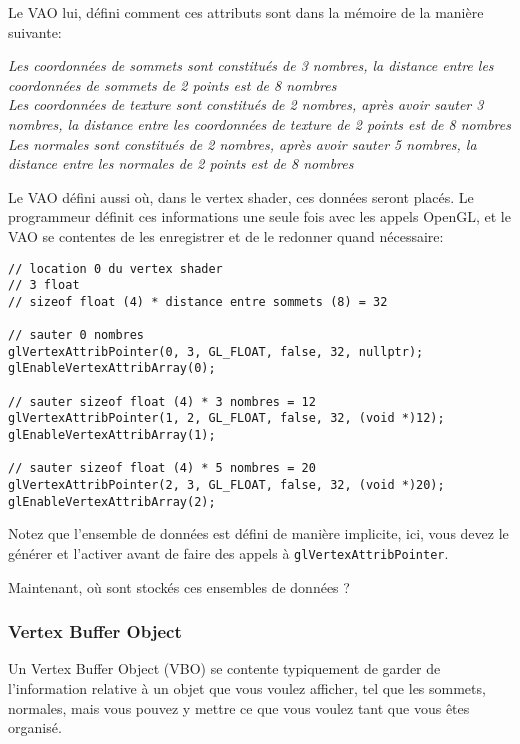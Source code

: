 \documentclass[11pt, a4paper, titlepage]{article}
\begin{document}
Le VAO lui, défini comment ces attributs sont dans la mémoire de la
manière suivante:

\emph{Les coordonnées de sommets sont constitués de 3 nombres, la
  distance entre les coordonnées de sommets de 2 points est de 8
  nombres\\}
\emph{Les coordonnées de texture sont constitués de 2
  nombres, après avoir sauter 3 nombres, la distance entre les
  coordonnées de texture de 2 points est de 8 nombres\\}
\emph{Les normales sont constitués de 2 nombres, après avoir sauter
 5 nombres, la distance entre les normales de 2 points est de 8
 nombres\\}

\pagebreak

Le VAO défini aussi où, dans le vertex shader, ces données seront
placés.  Le programmeur définit ces informations une seule fois avec
les appels OpenGL, et le VAO se contentes de les enregistrer et de le
redonner quand nécessaire:

\begin{lstlisting}
// location 0 du vertex shader
// 3 float
// sizeof float (4) * distance entre sommets (8) = 32

// sauter 0 nombres
glVertexAttribPointer(0, 3, GL_FLOAT, false, 32, nullptr);
glEnableVertexAttribArray(0);

// sauter sizeof float (4) * 3 nombres = 12
glVertexAttribPointer(1, 2, GL_FLOAT, false, 32, (void *)12);
glEnableVertexAttribArray(1);

// sauter sizeof float (4) * 5 nombres = 20 
glVertexAttribPointer(2, 3, GL_FLOAT, false, 32, (void *)20);
glEnableVertexAttribArray(2);
\end{lstlisting}

Notez que l'ensemble de données est défini de manière implicite, ici,
vous devez le générer et l'activer avant de faire des appels à
\texttt{glVertexAttribPointer}.

Maintenant, où sont stockés ces ensembles de données ?

\pagebreak

\subsubsection{Vertex Buffer Object}

Un Vertex Buffer Object (VBO) se contente typiquement de garder de
l'information relative à un objet que vous voulez afficher, tel que
les sommets, normales, mais vous pouvez y mettre ce que vous voulez
tant que vous êtes organisé.
\end{document}
